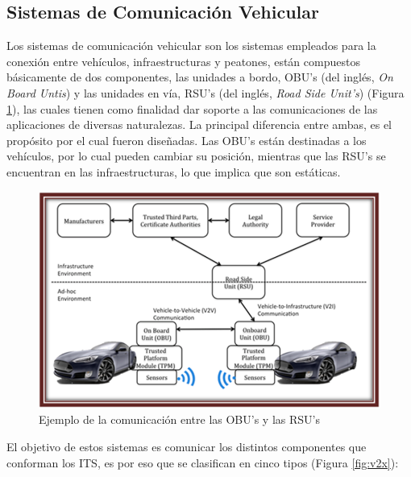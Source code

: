 \subsection{Sistemas de Comunicación Vehicular}

Los sistemas de comunicación vehicular son los sistemas empleados para la conexión entre vehículos, infraestructuras y peatones, están compuestos básicamente de dos componentes, las unidades a bordo, OBU's (del inglés, \textit{On Board Untis}) y las unidades en vía, RSU's (del inglés, \textit{ Road Side Unit's}) (Figura \ref{fig:obursu}), las cuales tienen como finalidad dar soporte a las comunicaciones de las aplicaciones de diversas naturalezas. La principal diferencia entre ambas, es el propósito por el cual fueron diseñadas. Las OBU's están destinadas a los vehículos, por lo cual pueden cambiar su posición, mientras que las RSU's se encuentran en las infraestructuras, lo que implica que son estáticas.\\

\begin{figure}[!h]
	\centering
		\includegraphics[scale=0.8]{Imagenes/obursu}
		\caption[Ejemplo de la comunicación entre las OBU's y las RSU's, for L0F]{Ejemplo de la comunicación entre las OBU's y las RSU's \protect\footnotemark}
		\label{fig:obursu}
	\end{figure}	

 \par El objetivo de estos sistemas es comunicar los distintos componentes que conforman los ITS, es por eso que se clasifican en cinco tipos\cite{da2014data} (Figura \ref{fig:v2x}):

